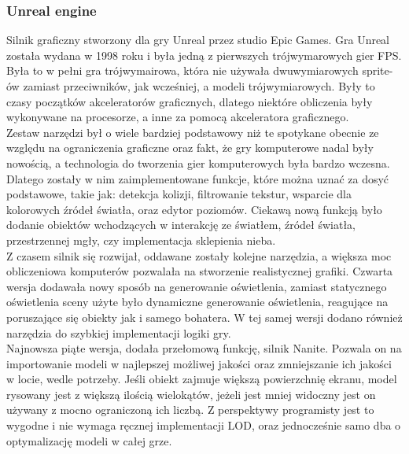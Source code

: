 \documentclass{article} %
\begin{document}
        \subsubsection*{Unreal engine}
        Silnik graficzny stworzony dla gry Unreal przez studio Epic Games. Gra Unreal została wydana w 1998 roku i była jedną z pierwszych trójwymarowych gier FPS. Była to w pełni gra trójwymairowa, która nie używała dwuwymiarowych sprite-ów zamiast przeciwników, jak wcześniej, a modeli trójwymiarowych. Były to czasy początków akceleratorów graficznych, dlatego niektóre obliczenia były wykonywane na procesorze, a inne za pomocą akceleratora graficznego.
        \\
        
        Zestaw narzędzi był o wiele bardziej podstawowy niż te spotykane obecnie ze względu na ograniczenia graficzne oraz fakt, że gry komputerowe nadal były nowością, a technologia do tworzenia gier komputerowych była bardzo wczesna. Dlatego zostały w nim zaimplementowane funkcje, które można uznać za dosyć podstawowe, takie jak: detekcja kolizji, filtrowanie tekstur, wsparcie dla kolorowych źródeł światła, oraz edytor poziomów. Ciekawą nową funkcją było dodanie obiektów wchodzących w interakcję ze światłem, źródeł światła, przestrzennej mgły, czy implementacja sklepienia nieba.
        \\
        
        Z czasem silnik się rozwijał, oddawane zostały kolejne narzędzia, a większa moc obliczeniowa komputerów pozwalała na stworzenie realistycznej grafiki. Czwarta wersja dodawała nowy sposób na generowanie oświetlenia, zamiast statycznego oświetlenia sceny użyte było dynamiczne generowanie oświetlenia, reagujące na poruszające się obiekty jak i samego bohatera. W tej samej wersji dodano również narzędzia do szybkiej implementacji logiki gry.
        \\
        
        Najnowsza piąte wersja, dodała przełomową funkcję, silnik Nanite. Pozwala on na importowanie modeli w najlepszej możliwej jakości oraz zmniejszanie ich jakości w locie, wedle potrzeby. Jeśli obiekt zajmuje większą powierzchnię ekranu, model rysowany jest z większą ilością wielokątów, jeżeli jest mniej widoczny jest on używany z mocno ograniczoną ich liczbą. Z perspektywy programisty jest to wygodne i nie wymaga ręcznej implementacji LOD, oraz jednocześnie samo dba o optymalizację modeli w całej grze.
        \\
        
\end{document}

